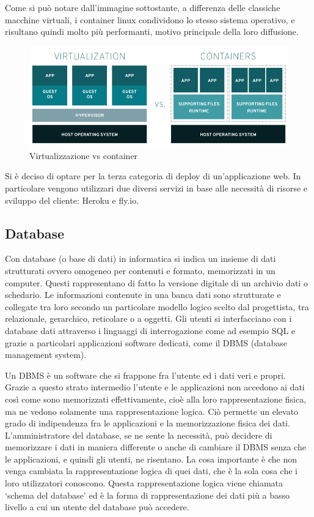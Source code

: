 \documentclass[12pt,a4paper]{article}
\begin{document}
Come si può notare dall’immagine sottostante, a differenza delle classiche macchine virtuali, i container linux condividono lo stesso sistema operativo, e risultano quindi molto più performanti, motivo principale della loro diffusione.

\begin{figure}[H]
    \centering
    \includegraphics[width=.9\linewidth]{vm_docker.png}
    \caption{Virtualizzazione vs container}
\end{figure}

Si è deciso di optare per la terza categoria di deploy di un’applicazione web. In particolare vengono utilizzari due diversi servizi in base alle necessità di risorse e sviluppo del cliente: Heroku e fly.io.


\subsection{Database}
Con database (o base di dati) in informatica si indica un insieme di dati strutturati ovvero omogeneo per contenuti e formato, memorizzati in un computer. Questi rappresentano di fatto la versione digitale di un archivio dati o schedario.
Le informazioni contenute in una banca dati sono strutturate e collegate tra loro secondo un particolare modello logico scelto dal progettista, tra relazionale, gerarchico, reticolare o a oggetti. Gli utenti si interfacciano con i database dati attraverso i linguaggi di interrogazione come ad esempio SQL e grazie a particolari applicazioni software dedicati, come il DBMS (database management system).

Un DBMS è un software che si frappone fra l’utente ed i dati veri e propri. Grazie a questo strato intermedio l’utente e le applicazioni non accedono ai dati così come sono memorizzati effettivamente, cioè alla loro rappresentazione fisica, ma ne vedono solamente una rappresentazione logica. Ciò permette un elevato grado di indipendenza fra le applicazioni e la memorizzazione fisica dei dati. L’amministratore del database, se ne sente la necessità, può decidere di memorizzare i dati in maniera differente o anche di cambiare il DBMS senza che le applicazioni, e quindi gli utenti, ne risentano. La cosa importante è che non venga cambiata la rappresentazione logica di quei dati, che è la sola cosa che i loro utilizzatori conoscono. Questa rappresentazione logica viene chiamata ‘schema del database’ ed è la forma di rappresentazione dei dati più a basso livello a cui un utente del database può accedere.
\end{document}
